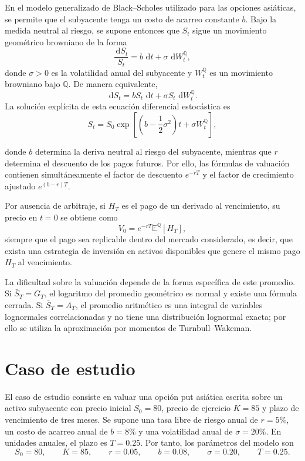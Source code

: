 \documentclass[11pt,letterpaper]{article}
\newcommand{\E}{\mathbb{E}}
\newcommand{\Q}{\mathbb{Q}}
\newcommand{\dd}{\,\mathrm{d}}
\begin{document}
En el modelo generalizado de Black--Scholes utilizado para las opciones asiáticas, se permite que el subyacente tenga un costo de acarreo constante \(b\). Bajo la medida neutral al riesgo, se supone entonces que \(S_t\) sigue un movimiento geométrico browniano de la forma
\begin{equation}
\frac{\dd S_t}{S_t}
=
b\,\dd t+\sigma\,\dd W_t^\Q,
\end{equation}
donde \(\sigma>0\) es la volatilidad anual del subyacente y \(W_t^\Q\) es un movimiento browniano bajo \(\Q\). De manera equivalente,
\begin{equation}
\dd S_t
=
bS_t\,\dd t+\sigma S_t\,\dd W_t^\Q.
\end{equation}
La solución explícita de esta ecuación diferencial estocástica es
\begin{equation}
S_t
=
S_0
\exp\left[
\left(b-\frac{1}{2}\sigma^2\right)t+\sigma W_t^\Q
\right],
\end{equation}

donde \(b\) determina la deriva neutral al riesgo del subyacente, mientras que \(r\) determina el descuento de los pagos futuros. Por ello, las fórmulas de valuación contienen simultáneamente el factor de descuento \(e^{-rT}\) y el factor de crecimiento ajustado \(e^{(b-r)T}\).

Por ausencia de arbitraje, si \(H_T\) es el pago de un derivado al vencimiento, su precio en \(t=0\) se obtiene como
\begin{equation}
V_0
=
e^{-rT}\E^\Q[H_T],
\end{equation}
siempre que el pago sea replicable dentro del mercado considerado, es decir, que exista una estrategia de inversión en activos disponibles que genere el mismo pago \(H_T\) al vencimiento.

La dificultad sobre la valuación depende de la forma específica de este promedio. Si \(\bar S_T=G_T\), el logaritmo del promedio geométrico es normal y existe una fórmula cerrada. Si \(\bar S_T=A_T\), el promedio aritmético es una integral de variables lognormales correlacionadas y no tiene una distribución lognormal exacta; por ello se utiliza la aproximación por momentos de Turnbull--Wakeman.

\section{Caso de estudio}

El caso de estudio consiste en valuar una opción put asiática escrita sobre un activo subyacente con precio inicial \(S_0=80\), precio de ejercicio \(K=85\) y plazo de vencimiento de tres meses. Se supone una tasa libre de riesgo anual de \(r=5\%\), un costo de acarreo anual de \(b=8\%\) y una volatilidad anual de \(\sigma=20\%\). En unidades anuales, el plazo es \(T=0.25\). Por tanto, los parámetros del modelo son
\begin{equation}
S_0=80,
\qquad
K=85,
\qquad
r=0.05,
\qquad
b=0.08,
\qquad
\sigma=0.20,
\qquad
T=0.25.
\end{equation}
\end{document}
